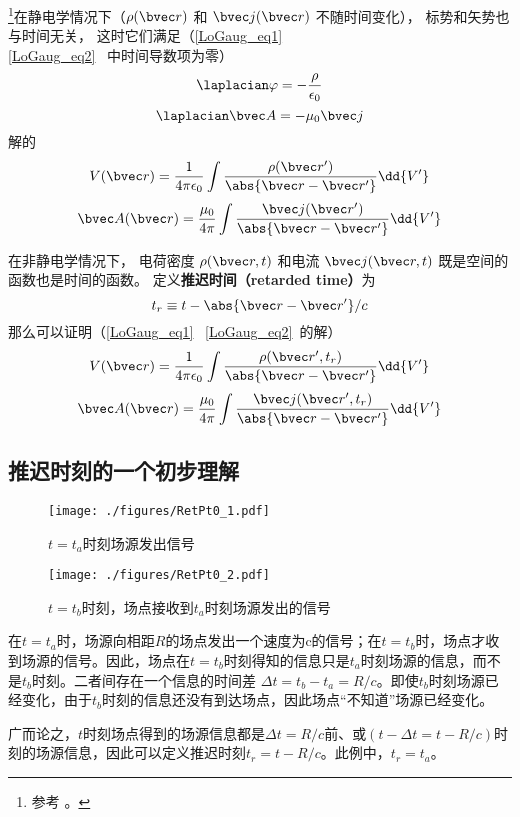 

\footnote{参考 \cite{GriffE}。}在静电学情况下（$\rho(\bvec r)$ 和 $\bvec j(\bvec r)$ 不随时间变化）， 标势和矢势也与时间无关， 这时它们满足（\autoref{LoGaug_eq1}~ \autoref{LoGaug_eq2}~ 中时间导数项为零）
\begin{equation}
\laplacian \varphi = -\frac{\rho}{\epsilon_0}
\end{equation}
\begin{equation}
\laplacian \bvec A = -\mu_0 \bvec j
\end{equation}
解的
\begin{equation}
V(\bvec r) = \frac{1}{4\pi\epsilon_0} \int \frac{\rho(\bvec r')}{\abs{\bvec r - \bvec r'}} \dd{V'}
\end{equation}
\begin{equation}
\bvec A(\bvec r) = \frac{\mu_0}{4\pi} \int \frac{\bvec j(\bvec r')}{\abs{\bvec r - \bvec r'}} \dd{V'}
\end{equation}

在非静电学情况下， 电荷密度 $\rho(\bvec r, t)$ 和电流 $\bvec j(\bvec r, t)$ 既是空间的函数也是时间的函数。 定义\textbf{推迟时间（retarded time）}为
\begin{equation}
t_r \equiv t - \abs{\bvec r - \bvec r'}/c
\end{equation}
那么可以证明（\autoref{LoGaug_eq1}~ \autoref{LoGaug_eq2}~的解）
\begin{equation}
V(\bvec r) = \frac{1}{4\pi\epsilon_0} \int \frac{\rho(\bvec r', t_r)}{\abs{\bvec r - \bvec r'}} \dd{V'}
\end{equation}
\begin{equation}
\bvec A(\bvec r) = \frac{\mu_0}{4\pi} \int \frac{\bvec j(\bvec r', t_r)}{\abs{\bvec r - \bvec r'}} \dd{V'}
\end{equation}

\subsection{推迟时刻的一个初步理解}
\begin{figure}[ht]
\centering
\texttt{[image: ./figures/RetPt0\_1.pdf]}
\caption{$t=t_a$时刻场源发出信号} \label{RetPt0_fig1}
\end{figure}
\begin{figure}[ht]
\centering
\texttt{[image: ./figures/RetPt0\_2.pdf]}
\caption{$t=t_b$时刻，场点接收到$t_a$时刻场源发出的信号} \label{RetPt0_fig2}
\end{figure}

在$t=t_a$时，场源向相距$R$的场点发出一个速度为c的信号；在$t=t_b$时，场点才收到场源的信号。因此，场点在$t=t_b$时刻得知的信息只是$t_a$时刻场源的信息，而不是$t_b$时刻。二者间存在一个信息的时间差 $\Delta t= t_b-t_a = R/c $。即使$t_b$时刻场源已经变化，由于$t_b$时刻的信息还没有到达场点，因此场点“不知道”场源已经变化。

广而论之，$t$时刻场点得到的场源信息都是$\Delta t = R/c$前、或$(t-\Delta t = t-R/c)$时刻的场源信息，因此可以定义推迟时刻$t_r=t-R/c$。此例中，$t_r=t_a$。
